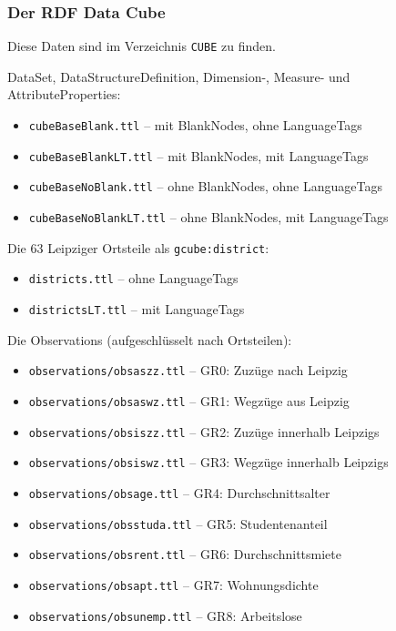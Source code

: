 \documentclass[a4paper,11pt]{article}
\begin{document}
\subsubsection{Der RDF Data Cube}

Diese Daten sind im Verzeichnis \texttt{CUBE} zu finden.

DataSet, DataStructureDefinition, Dimension-, Measure- und
AttributeProperties:
\begin{itemize}
\setlength{\itemsep}{-2pt}
\item \texttt{cubeBaseBlank.ttl} -- mit BlankNodes, ohne LanguageTags
\item \texttt{cubeBaseBlankLT.ttl} -- mit BlankNodes, mit LanguageTags
\item \texttt{cubeBaseNoBlank.ttl} -- ohne BlankNodes, ohne LanguageTags
\item \texttt{cubeBaseNoBlankLT.ttl} -- ohne BlankNodes, mit LanguageTags
\end{itemize}

Die 63 Leipziger Ortsteile als \texttt{gcube:district}:
\begin{itemize}
\setlength{\itemsep}{-2pt}
\item \texttt{districts.ttl} -- ohne LanguageTags
\item \texttt{districtsLT.ttl} -- mit LanguageTags
\end{itemize}

Die Observations (aufgeschlüsselt nach Ortsteilen):
\begin{itemize}
\setlength{\itemsep}{-2pt}
\item \texttt{observations/obsaszz.ttl} -- GR0: Zuzüge nach Leipzig
\item \texttt{observations/obsaswz.ttl} -- GR1: Wegzüge aus Leipzig 
\item \texttt{observations/obsiszz.ttl} -- GR2: Zuzüge innerhalb Leipzigs
\item \texttt{observations/obsiswz.ttl} -- GR3: Wegzüge innerhalb Leipzigs 
\item \texttt{observations/obsage.ttl} -- GR4:  Durchschnittsalter
\item \texttt{observations/obsstuda.ttl} -- GR5: Studentenanteil
\item \texttt{observations/obsrent.ttl} -- GR6: Durchschnittsmiete
\item \texttt{observations/obsapt.ttl} -- GR7: Wohnungsdichte
\item \texttt{observations/obsunemp.ttl} -- GR8: Arbeitslose
\end{itemize}
\end{document}
